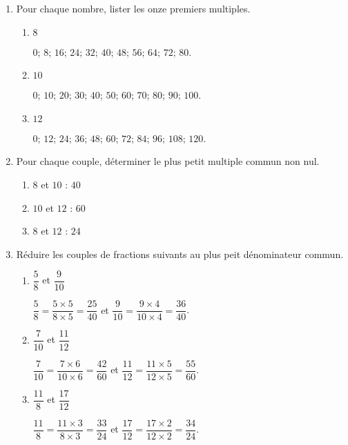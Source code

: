\begin{corrige}
    \begin{enumerate}
        \item Pour chaque nombre, lister les onze premiers multiples.
        
            \begin{enumerate}
                \item $8$  
                
                {\red $0$; $8$;  $16$; $24$; $32$; $40$; $48$; $56$; $64$; $72$; $80$.}
                \item $10$ 
                
                {\red $0$; $10$; $20$; $30$; $40$; $50$; $60$; $70$; $80$; $90$; $100$.}
                \item $12$ 
                
                {\red $0$; $12$; $24$; $36$; $48$; $60$; $72$; $84$; $96$; $108$; $120$.}
            \end{enumerate}  
        \setcounter{enumi}{1}
        \item Pour chaque couple, déterminer le plus petit multiple commun non nul.

            \begin{enumerate}
                \item $8$ et $10$  {\red : $40$}
                \item $10$ et $12$ {\red : $60$}
                \item $8$ et $12$  {\red : $24$}
            \end{enumerate}           
        \setcounter{enumi}{2}
        \item Réduire les couples de fractions suivants au plus peit dénominateur commun.
        
            \begin{spacing}{2}
                \begin{enumerate}
                    \item $\dfrac{5}{8}$ et $\dfrac{9}{10}$   
                    
                    {\red $\dfrac{5}{8}=\dfrac{5\times5}{8\times5}=\dfrac{25}{40}$ et $\dfrac{9}{10}=\dfrac{9\times4}{10\times4}=\dfrac{36}{40}$}.
                    \item $\dfrac{7}{10}$ et $\dfrac{11}{12}$ 
                    
                    {\red $\dfrac{7}{10}=\dfrac{7\times6}{10\times6}=\dfrac{42}{60}$ et $\dfrac{11}{12}=\dfrac{11\times5}{12\times5}=\dfrac{55}{60}$}.
                    \item $\dfrac{11}{8}$ et $\dfrac{17}{12}$ 
                    
                    {\red $\dfrac{11}{8}=\dfrac{11\times3}{8\times3}=\dfrac{33}{24}$ et $\dfrac{17}{12}=\dfrac{17\times2}{12\times2}=\dfrac{34}{24}$}.
                \end{enumerate}
            \end{spacing}
    \end{enumerate}
\end{corrige}

